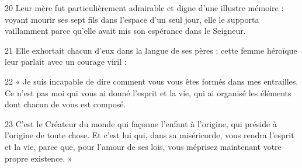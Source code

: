 20 Leur mère fut particulièrement admirable et digne d’une illustre mémoire : voyant mourir ses sept fils dans l’espace d’un seul jour, elle le supporta vaillamment parce qu’elle avait mis son espérance dans le Seigneur.

21 Elle exhortait chacun d’eux dans la langue de ses pères ; cette femme héroïque leur parlait avec un courage viril :

22 « Je suis incapable de dire comment vous vous êtes formés dans mes entrailles. Ce n’est pas moi qui vous ai donné l’esprit et la vie, qui ai organisé les éléments dont chacun de vous est composé.

23 C’est le Créateur du monde qui façonne l’enfant à l’origine, qui préside à l’origine de toute chose. Et c’est lui qui, dans sa miséricorde, vous rendra l’esprit et la vie, parce que, pour l’amour de ses lois, vous méprisez maintenant votre propre existence. »